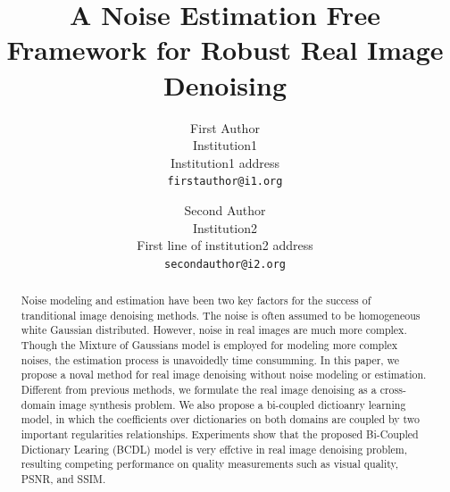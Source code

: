 \documentclass[10pt,twocolumn,letterpaper]{article}
\begin{document}
\title{A Noise Estimation Free Framework for Robust Real Image Denoising}

\author{First Author\\
Institution1\\
Institution1 address\\
{\tt\small firstauthor@i1.org}
\and
Second Author\\
Institution2\\
First line of institution2 address\\
{\tt\small secondauthor@i2.org}
}

\maketitle

\begin{abstract}
Noise modeling and estimation have been two key factors for the success of tranditional image denoising methods. The noise is often assumed to be homogeneous white Gaussian distributed. However, noise in real images are much more complex. Though the Mixture of Gaussians model is employed for modeling more complex noises, the estimation process is unavoidedly time consumming. In this paper, we propose a noval method for real image denoising without noise modeling or estimation. Different from previous methods, we formulate the real image denoising as a cross-domain image synthesis problem. We also propose a bi-coupled dictioanry learning model, in which the coefficients over dictionaries on both domains are coupled by two important regularities  relationships. Experiments show that the proposed Bi-Coupled Dictionary Learing (BCDL) model is very effctive in real image denoising problem, resulting competing performance on quality measurements such as visual quality, PSNR, and SSIM.
\end{abstract}

\end{document}
